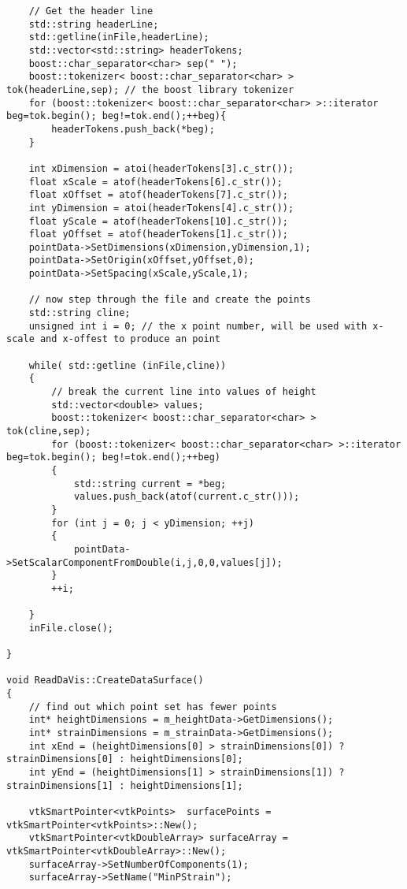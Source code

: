 \begin{lstlisting}
    // Get the header line
    std::string headerLine;
    std::getline(inFile,headerLine);
    std::vector<std::string> headerTokens;
    boost::char_separator<char> sep(" ");
    boost::tokenizer< boost::char_separator<char> > tok(headerLine,sep); // the boost library tokenizer
    for (boost::tokenizer< boost::char_separator<char> >::iterator beg=tok.begin(); beg!=tok.end();++beg){
        headerTokens.push_back(*beg);
    }

    int xDimension = atoi(headerTokens[3].c_str());
    float xScale = atof(headerTokens[6].c_str());
    float xOffset = atof(headerTokens[7].c_str());
    int yDimension = atoi(headerTokens[4].c_str());
    float yScale = atof(headerTokens[10].c_str());
    float yOffset = atof(headerTokens[1].c_str());
    pointData->SetDimensions(xDimension,yDimension,1);
    pointData->SetOrigin(xOffset,yOffset,0);
    pointData->SetSpacing(xScale,yScale,1);

    // now step through the file and create the points
    std::string cline;
    unsigned int i = 0; // the x point number, will be used with x-scale and x-offest to produce an point

    while( std::getline (inFile,cline))
    {
        // break the current line into values of height
        std::vector<double> values;
        boost::tokenizer< boost::char_separator<char> > tok(cline,sep);
        for (boost::tokenizer< boost::char_separator<char> >::iterator beg=tok.begin(); beg!=tok.end();++beg)
        {
            std::string current = *beg;
            values.push_back(atof(current.c_str()));
        }
        for (int j = 0; j < yDimension; ++j)
        {
            pointData->SetScalarComponentFromDouble(i,j,0,0,values[j]);
        }
        ++i;

    }
    inFile.close();

}

void ReadDaVis::CreateDataSurface()
{
    // find out which point set has fewer points
    int* heightDimensions = m_heightData->GetDimensions();
    int* strainDimensions = m_strainData->GetDimensions();
    int xEnd = (heightDimensions[0] > strainDimensions[0]) ? strainDimensions[0] : heightDimensions[0];
    int yEnd = (heightDimensions[1] > strainDimensions[1]) ? strainDimensions[1] : heightDimensions[1];

    vtkSmartPointer<vtkPoints>  surfacePoints = vtkSmartPointer<vtkPoints>::New();
    vtkSmartPointer<vtkDoubleArray> surfaceArray = vtkSmartPointer<vtkDoubleArray>::New();
    surfaceArray->SetNumberOfComponents(1);
    surfaceArray->SetName("MinPStrain");


\end{lstlisting}
